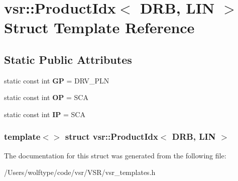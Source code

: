 \hypertarget{structvsr_1_1_product_idx_3_01_d_r_b_00_01_l_i_n_01_4}{\section{vsr\-:\-:Product\-Idx$<$ D\-R\-B, L\-I\-N $>$ Struct Template Reference}
\label{structvsr_1_1_product_idx_3_01_d_r_b_00_01_l_i_n_01_4}
}
\subsection*{Static Public Attributes}
\begin{DoxyCompactItemize}
\item 
\hypertarget{structvsr_1_1_product_idx_3_01_d_r_b_00_01_l_i_n_01_4_af9a47b88362379d4d9b2c1b2a6dade1b}{static const int {\bfseries G\-P} = D\-R\-V\-\_\-\-P\-L\-N}\label{structvsr_1_1_product_idx_3_01_d_r_b_00_01_l_i_n_01_4_af9a47b88362379d4d9b2c1b2a6dade1b}

\item 
\hypertarget{structvsr_1_1_product_idx_3_01_d_r_b_00_01_l_i_n_01_4_a898d282da9a7c27f6ac6cb13709da880}{static const int {\bfseries O\-P} = S\-C\-A}\label{structvsr_1_1_product_idx_3_01_d_r_b_00_01_l_i_n_01_4_a898d282da9a7c27f6ac6cb13709da880}

\item 
\hypertarget{structvsr_1_1_product_idx_3_01_d_r_b_00_01_l_i_n_01_4_ab9090d28b19f7c3c738708ac98fb6cb5}{static const int {\bfseries I\-P} = S\-C\-A}\label{structvsr_1_1_product_idx_3_01_d_r_b_00_01_l_i_n_01_4_ab9090d28b19f7c3c738708ac98fb6cb5}

\end{DoxyCompactItemize}
\subsubsection*{template$<$$>$ struct vsr\-::\-Product\-Idx$<$ D\-R\-B, L\-I\-N $>$}



The documentation for this struct was generated from the following file\-:\begin{DoxyCompactItemize}
\item 
/\-Users/wolftype/code/vsr/\-V\-S\-R/vsr\-\_\-templates.\-h\end{DoxyCompactItemize}
